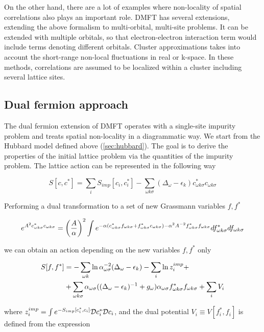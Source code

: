 On the other hand, there are a lot of examples where non-locality of spatial correlations also plays an important role.
DMFT has several extensions, extending the above formalism to multi-orbital, multi-site problems.
It can be extended with multiple orbitals, so that electron-electron interaction term would include terms denoting different orbitals.
Cluster approximations takes into account the short-range non-local fluctuations in real or k-space.
In these methods, correlations are assumed to be localized within a cluster including several lattice sites.

\subsection{Dual fermion approach}
The dual fermion extension of DMFT\cite{0810.3819} operates with a single-site impurity problem and treats spatial non-locality in a diagrammatic way.
We start from the Hubbard model defined above (\autoref{sec:hubbard}).
The goal is to derive the properties of the initial lattice problem via the quantities of the impurity problem.
The lattice action can be represented in the following way

\begin{equation} S[c,c^*] = \sum_i S_{imp}[c_i,c_i^*] - \sum_{\omega k \sigma}(\Delta_\omega-\epsilon_k)c_{\omega k\sigma}^* c_{\omega k\sigma} \end{equation}

Performing a dual transformation to a set of new Grassmann variables $f,f^*$

\begin{equation} e^{A^2 c_{\omega k\sigma}^*c_{\omega k\sigma}} = \left(\frac{A}{\alpha}\right)^2 \int 
    e^{-\alpha(c_{\omega k\sigma}^*f_{\omega k\sigma}+f_{\omega k\sigma}^*c_{\omega k\sigma})-\alpha^2 A^{-2}f_{\omega k\sigma}^*f_{\omega k\sigma}}df_{\omega k\sigma}^*df_{\omega k\sigma}
 \end{equation}

we can obtain an action depending on the new variables $f,f^*$ only

\begin{equation}\begin{aligned}
S[f,f^*] & = -\sum_{\omega k} \ln{\alpha_{\omega\sigma}^{-2}(\Delta_\omega-\epsilon_k)} - \sum_i\ln{z_i^{imp}} + \\ 
	 & + \sum_{\omega k\sigma} \alpha_{\omega\sigma}((\Delta_\omega-\epsilon_k)^{-1}+g_\omega) \alpha_{\omega\sigma}f_{\omega k\sigma}^*f_{\omega k\sigma}+\sum_i V_i 
\end{aligned}\end{equation}

where $z_i^{imp} = \int e^{-S_{imp}[c_i^*,c_i]}\mathcal{D} c_i^*\mathcal{D} c_i$, and the dual potential $V_i \equiv V[f_i^*,f_i]$ is defined from the expression

